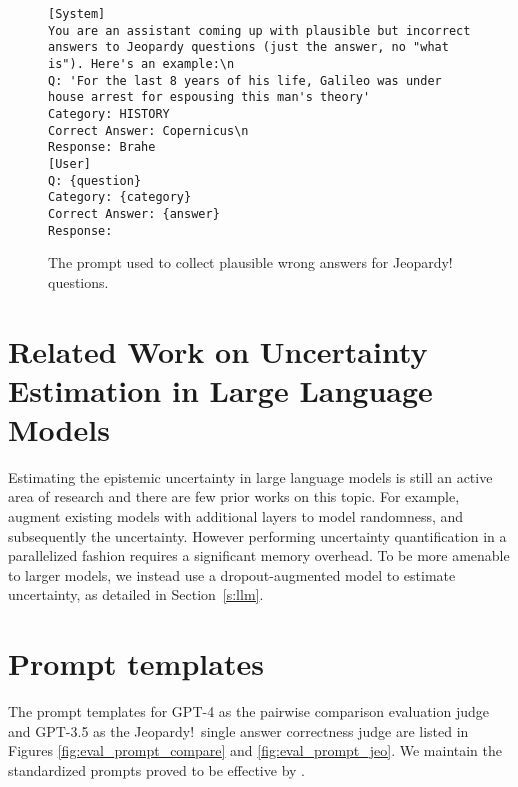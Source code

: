 \documentclass{article} \usepackage{iclr2023_conference,times}
\begin{document}
\begin{figure}
\begin{tcolorbox}[colback=white]
\begin{lstlisting}[breaklines, breakindent=0pt, basicstyle=\ttfamily\footnotesize]
[System]
You are an assistant coming up with plausible but incorrect answers to Jeopardy questions (just the answer, no "what is"). Here's an example:\n
Q: 'For the last 8 years of his life, Galileo was under house arrest for espousing this man's theory'
Category: HISTORY
Correct Answer: Copernicus\n
Response: Brahe
[User]
Q: {question}
Category: {category}
Correct Answer: {answer}
Response:
\end{lstlisting}
\end{tcolorbox}
\caption{The prompt used to collect plausible wrong answers for Jeopardy! questions.}
\label{fig:jeopardy_prompt}
\end{figure}


\section{Related Work on Uncertainty Estimation in Large Language Models}
\label{a:uncertaintyllms}
Estimating the epistemic uncertainty in large language models is still an active area of research and there are few prior works on this topic.
For example, \cite{osband2022fine} augment existing models with additional layers to model randomness, and subsequently the uncertainty. However performing uncertainty quantification in a parallelized fashion requires a significant memory overhead. To be more amenable to larger models, we instead use a dropout-augmented model to estimate uncertainty, as detailed in Section~\ref{s:llm}.


\section{Prompt templates}
\label{a:eval_prompt}
The prompt templates for GPT-4 as the pairwise comparison evaluation judge and GPT-3.5 as the Jeopardy!\ single answer correctness judge are listed in Figures \ref{fig:eval_prompt_compare} and \ref{fig:eval_prompt_jeo}. We maintain the standardized prompts proved to be effective by \citet{zheng2023judging}.
\end{document}
